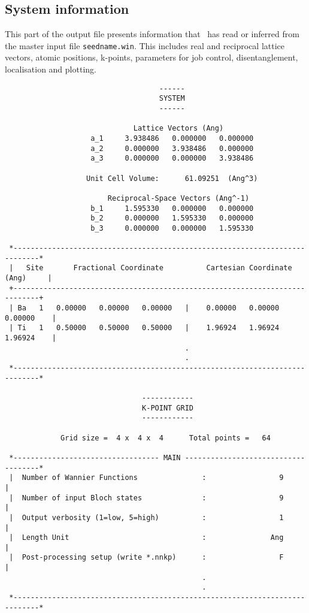 \begin{verbatim}
\end{verbatim}

\subsection{System information}

This part of the output file presents information that \wannier\ has
read or inferred from the master input file {\tt seedname.win}. This
includes real and reciprocal lattice vectors, atomic positions,
k-points, parameters for job control, disentanglement, localisation
and plotting. 

\begin{verbatim}
                                    ------
                                    SYSTEM
                                    ------
 
                              Lattice Vectors (Ang)
                    a_1     3.938486   0.000000   0.000000
                    a_2     0.000000   3.938486   0.000000
                    a_3     0.000000   0.000000   3.938486
 
                   Unit Cell Volume:      61.09251  (Ang^3)
 
                        Reciprocal-Space Vectors (Ang^-1)
                    b_1     1.595330   0.000000   0.000000
                    b_2     0.000000   1.595330   0.000000
                    b_3     0.000000   0.000000   1.595330
  
 *----------------------------------------------------------------------------*
 |   Site       Fractional Coordinate          Cartesian Coordinate (Ang)     |
 +----------------------------------------------------------------------------+
 | Ba   1   0.00000   0.00000   0.00000   |    0.00000   0.00000   0.00000    |
 | Ti   1   0.50000   0.50000   0.50000   |    1.96924   1.96924   1.96924    |
                                          .
                                          . 
 *----------------------------------------------------------------------------*
  
                                ------------
                                K-POINT GRID
                                ------------
  
             Grid size =  4 x  4 x  4      Total points =   64
  
 *---------------------------------- MAIN ------------------------------------*
 |  Number of Wannier Functions               :                 9             |
 |  Number of input Bloch states              :                 9             |
 |  Output verbosity (1=low, 5=high)          :                 1             |
 |  Length Unit                               :               Ang             |
 |  Post-processing setup (write *.nnkp)      :                 F             |
                                              .
                                              .
 *----------------------------------------------------------------------------*
\end{verbatim}

